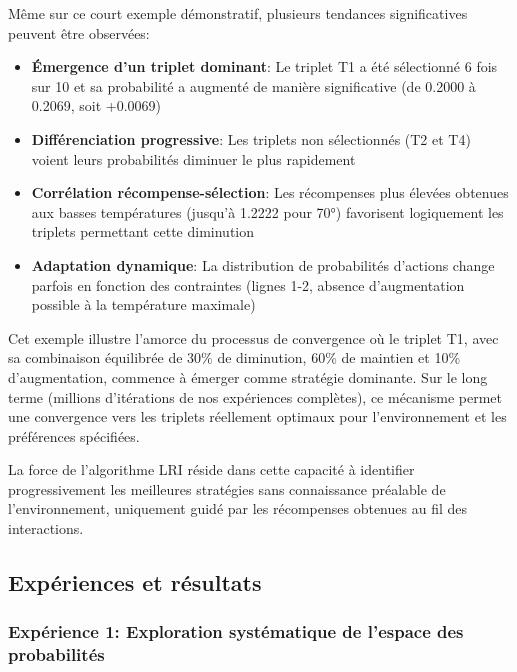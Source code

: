 Même sur ce court exemple démonstratif, plusieurs tendances significatives peuvent être observées:

\begin{itemize}
    \item \textbf{Émergence d'un triplet dominant}: Le triplet T1 a été sélectionné 6 fois sur 10 et sa probabilité a augmenté de manière significative (de 0.2000 à 0.2069, soit +0.0069)
    
    \item \textbf{Différenciation progressive}: Les triplets non sélectionnés (T2 et T4) voient leurs probabilités diminuer le plus rapidement
    
    \item \textbf{Corrélation récompense-sélection}: Les récompenses plus élevées obtenues aux basses températures (jusqu'à 1.2222 pour 70°) favorisent logiquement les triplets permettant cette diminution
    
    \item \textbf{Adaptation dynamique}: La distribution de probabilités d'actions change parfois en fonction des contraintes (lignes 1-2, absence d'augmentation possible à la température maximale)
\end{itemize}

Cet exemple illustre l'amorce du processus de convergence où le triplet T1, avec sa combinaison équilibrée de 30\% de diminution, 60\% de maintien et 10\% d'augmentation, commence à émerger comme stratégie dominante. Sur le long terme (millions d'itérations de nos expériences complètes), ce mécanisme permet une convergence vers les triplets réellement optimaux pour l'environnement et les préférences spécifiées.

La force de l'algorithme LRI réside dans cette capacité à identifier progressivement les meilleures stratégies sans connaissance préalable de l'environnement, uniquement guidé par les récompenses obtenues au fil des interactions.
\normalfont\normalsize
\normalsize


\subsection{Expériences et résultats \cite{LRIprobabiliste}}

\subsubsection{Expérience 1: Exploration systématique de l'espace des probabilités}

